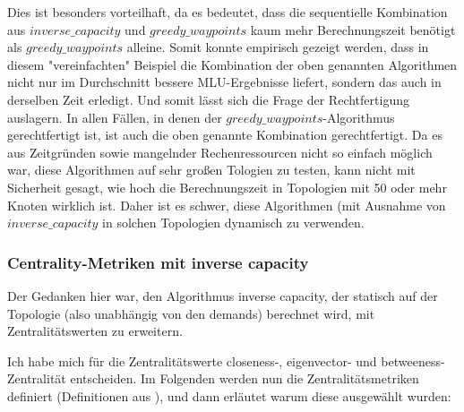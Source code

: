 \documentclass[sigconf, nonacm, review]{acmart}
\begin{document}
Dies ist besonders vorteilhaft, da es bedeutet, 
dass die sequentielle Kombination aus $inverse\_capacity$ und $greedy\_waypoints$ kaum mehr Berechnungszeit ben\"otigt als $greedy\_waypoints$ alleine.
Somit konnte empirisch gezeigt werden, 
dass in diesem "vereinfachten" Beispiel die Kombination der oben genannten Algorithmen nicht nur im Durchschnitt bessere MLU-Ergebnisse liefert, 
sondern das auch in derselben Zeit erledigt.
Und somit l\"asst sich die Frage der Rechtfertigung auslagern.
In allen F\"allen, in denen der $greedy\_waypoints$-Algorithmus gerechtfertigt ist,
ist auch die oben genannte Kombination gerechtfertigt.\newline
Da es aus Zeitgr\"unden sowie mangelnder Rechenressourcen nicht so einfach m\"oglich war,
diese Algorithmen auf sehr gro\ss en Tologien zu testen,
kann nicht mit Sicherheit gesagt, wie hoch die Berechnungszeit in Topologien mit 50 oder mehr Knoten wirklich ist.
Daher ist es schwer, diese Algorithmen (mit Ausnahme von $inverse\_capacity$ in solchen Topologien dynamisch zu verwenden.
\subsubsection{Centrality-Metriken mit inverse capacity}
Der Gedanken hier war, den Algorithmus inverse capacity, der statisch auf der Topologie (also unabh\"angig von den demands) berechnet wird, mit Zentralit\"atswerten zu erweitern.

Ich habe mich f\"ur die Zentralit\"atswerte closeness-, eigenvector- und betweeness-Zentralit\"at entscheiden.
Im Folgenden werden nun die Zentralit\"atsmetriken definiert (Definitionen aus \cite{guide}), und dann erl\"autet warum diese ausgew\"ahlt wurden:
\end{document}
